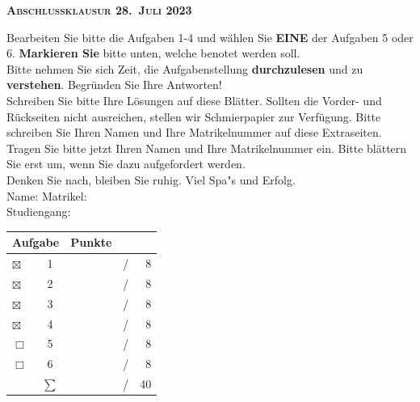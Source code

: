 \documentclass[a4paper]{article}
\begin{document}
% 

{
\kopf
}
 \begin{center}
   {\Large {\bfseries\scshape Abschlussklausur 28.~Juli 2023}}
\end{center}

\enlargethispage*{40mm}

Bearbeiten Sie bitte die Aufgaben 1-4 und w\"ahlen Sie {\bfseries
  \sffamily EINE} der Aufgaben 5 oder 6. {\bfseries Markieren Sie}
bitte unten, welche benotet werden soll. 
\\
Bitte nehmen Sie sich Zeit, die Aufgabenstellung {\bfseries
  durchzulesen} und zu {\bfseries verstehen}. Begr\"unden Sie Ihre
Antworten!
\\
Schreiben Sie bitte Ihre L\"osungen auf diese Bl\"atter. 
Sollten die Vorder- und R\"uckseiten nicht ausreichen, stellen wir
Schmierpapier zur Verf\"ugung.
Bitte schreiben Sie Ihren Namen und Ihre Matrikelnummer auf diese
Extraseiten. 
\\
Tragen Sie bitte jetzt Ihren Namen und Ihre Matrikelnummer ein.
Bitte bl\"attern Sie erst um, wenn Sie dazu aufgefordert werden.
\\[\baselineskip] %
Denken Sie nach, bleiben Sie ruhig. Viel Spa"s und Erfolg.
\\[\baselineskip] %
Name: \underline{\hspace{50mm}} \hfill
\mbox{Matrikel: \underline{\hspace{40mm}}}
\\[.5\baselineskip]
\mbox{} \hfill \mbox{Studiengang: \underline{\hspace{40mm}}}
\\[\baselineskip] %
\begin{center}
  \begin{tabular}{l c | rcr}
    \multicolumn{2}{r|}{Aufgabe} & Punkte \\
    \hline
    $\boxtimes$ & 1 & & / & 8 \\
    $\boxtimes$ & 2 & & / & 8 \\
    $\boxtimes$ & 3 & & / & 8 \\
    $\boxtimes$ & 4 & & / & 8 \\
    $\Box$ & 5 & & / & 8 \\
    $\Box$ & 6 & & / & 8 \\
    \hline
    & $\sum$ & & / & 40
  \end{tabular}
\end{center}
\vfill
\end{document}
